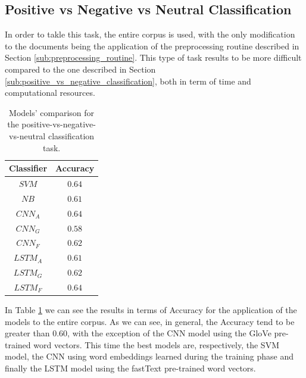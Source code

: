 \documentclass[11pt,twocolumn]{article}
\begin{document}
        \subsection{Positive vs Negative vs Neutral Classification} %
        \label{sub:positive_vs_negative_vs_neutral_classification}
            In order to takle this task, the entire corpus is used, with the only modification to the
            documents being the application of the preprocessing routine described in Section
            \ref{sub:preprocessing_routine}. This type of task results to be more difficult compared to
            the one described in Section \ref{sub:positive_vs_negative_classification}, both in term of
            time and computational resources.

            \begin{table}[h]
                \centering
                \begin{tabular}{| c | c |}
                    \hline
                    \textbf{Classifier} & \textbf{Accuracy} \\
                    \hline
                    $SVM$ & $0.64$ \\
                    \hline
                    $NB$ & $0.61$ \\
                    \hline
                    $CNN_A$ & $0.64$ \\
                    \hline
                    $CNN_G$ & $0.58$ \\
                    \hline
                    $CNN_F$ & $0.62$ \\
                    \hline
                    $LSTM_A$ & $0.61$ \\
                    \hline
                    $LSTM_G$ & $0.62$ \\
                    \hline
                    $LSTM_F$ & $0.64$ \\
                    \hline
                \end{tabular}
                \caption{Models' comparison for the positive-vs-negative-vs-neutral classification task.}
                \label{tab:a_comparison}
            \end{table}

            \noindent
            In Table \ref{tab:a_comparison} we can see the results in terms of Accuracy for the application
            of the models to the entire corpus. As we can see, in general, the Accuracy tend to be greater
            than $0.60$, with the exception of the CNN model using the GloVe pre-trained word vectors. This
            time the best models are, respectively, the SVM model, the CNN using word embeddings learned
            during the training phase and finally the LSTM model using the fastText pre-trained word
            vectors.
\end{document}

